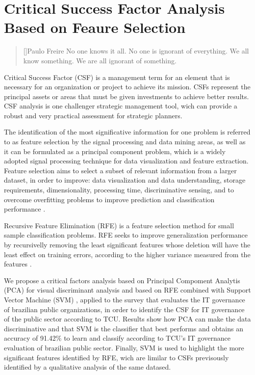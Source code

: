 \chapter{Critical Success Factor Analysis Based on Feaure Selection}
\label{ch:2_csf_fs}

\begin{quotation}[]{Paulo Freire}
No one knows it all. No one is ignorant of everything. We all know something. We are all ignorant of something.
\end{quotation}

Critical Success Factor (CSF) is a management term for an element that is necessary for an organization or project to achieve its mission. CSFs represent the principal assets or areas that must be given investments to achieve better results. CSF analysis is one challenger strategic management tool, wich can provide a robust and very practical assessment for strategic planners.

The identification of the most significative information for one problem is referred to as feature selection by the signal processing and data mining areas, as well as it can be formulated as a principal component problem, which is a widely adopted signal processing technique for data visualization and feature extraction. Feature selection aims to select a subset of relevant information from a larger dataset, in order to improve: data visualization and data understanding, storage requirements, dimensionality, processing time, discriminative sensing, and to overcome overfitting problems to improve prediction and classification performance \cite{chandrashekar2014survey}.

Recursive Feature Elimination (RFE) is a feature selection method for small sample classification problems. RFE seeks to improve generalization performance by recursivelly removing the least significant features whose deletion will have the least effect on training errors, according to the higher variance measured from the features \cite{chen2007enhanced}.

We propose a critical factors analysis based on Principal Compoment Analytis (PCA) for visual discriminant analysis and based on RFE combined with Support Vector Machine (SVM) \cite{hearst1998support}, applied to the survey that evaluates the IT governance of brazilian public organizations, in order to identify the CSF for IT governance of the public sector according to TCU. Results show how PCA can make the data discriminative and that SVM is the classifier that best performs and obtains an accuracy of 91.42\% to learn and classify according to TCU's IT governance evaluation of brazilian public sector. Finally, SVM is used to highlight the more significant features identified by RFE, wich are limilar to CSFs previsously identified by a qualitative analysis of the same datased.


